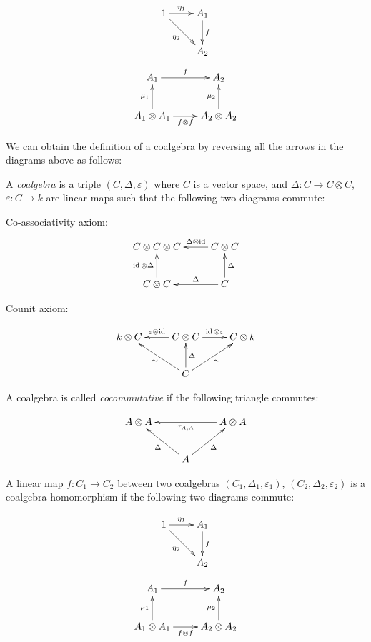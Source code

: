 \begin{equation}
    \xymatrix{
    1 \ar[r]^-{\eta_1} \ar[rd]_{\eta_2} & A_1 \ar[d]^-f \\
    & A_2
    }
\end{equation}
\begin{equation}
    \xymatrix{
    A_1 \ar[r]^-f & A_2 \\
    A_1 \otimes A_1 \ar[u]^-{\mu_1} \ar[r]_-{f\otimes f} & A_2 \otimes A_2 \ar[u]^-{\mu_2}
    }
\end{equation}


We can obtain the definition of a coalgebra by reversing all the arrows in the
diagrams above as follows:

\begin{defn}
    A \emph{coalgebra} is a triple $(C, \Delta, \varepsilon)$ where $C$ is a
    vector space, and $\Delta: C \to C \otimes C$, $\varepsilon: C \to k$ are
    linear maps such that the following two diagrams commute:

Co-associativity axiom:
\begin{equation}
\xymatrix{
C \otimes C \otimes C   & C \otimes C \ar[l]_-{\Delta \otimes \id}\\
 C \otimes C\ar[u]^-{\id \otimes \Delta}  & C \ar[l]_-\Delta \ar[u]_-{\Delta}
}
\end{equation}

Counit axiom:


\begin{equation}
    \xymatrix{
    k \otimes C  & C \otimes C \ar[l]_-{\varepsilon \otimes \id} \ar[r]^-{\id \otimes \varepsilon} & C \otimes k   \\
    & C \ar[u]_-\Delta \ar[lu]^-\simeq \ar[ru]_-{\simeq}&
    }
\end{equation}
\end{defn}
A coalgebra is called \emph{cocommutative} if the following triangle commutes:

\begin{equation}
    \xymatrix{
    A \otimes A   & & A \ar[ll]^-{\tau_{A,A}} \otimes A  \\
    & \ar[lu]^-\Delta A \ar[ru]_-\Delta&
    }
\end{equation}


A linear map $f: C_1 \to C_2$ between two coalgebras $(C_1, \Delta_1,
\varepsilon_1)$, $(C_2, \Delta_2, \varepsilon_2)$ is a coalgebra homomorphism
if the following two diagrams commute: 


\begin{equation}
    \xymatrix{
    1 \ar[r]^-{\eta_1} \ar[rd]_{\eta_2} & A_1 \ar[d]^-f \\
    & A_2
    }
\end{equation}
\begin{equation}
    \xymatrix{
    A_1 \ar[r]^-f & A_2 \\
    A_1 \otimes A_1 \ar[u]^-{\mu_1} \ar[r]_-{f\otimes f} & A_2 \otimes A_2 \ar[u]^-{\mu_2}
    }
\end{equation}



